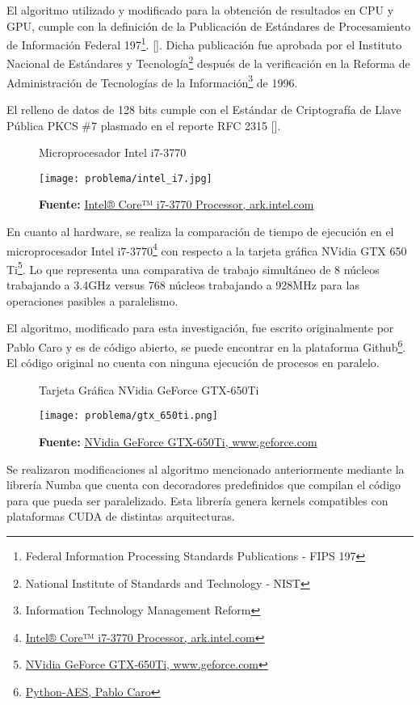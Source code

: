 \documentclass[../main/main.tex]{subfiles}
\begin{document}
  El algoritmo utilizado y modificado para la obtención de resultados en CPU y GPU, cumple con la definición de la Publicación de Estándares de Procesamiento de Información Federal 197\footnote{Federal Information Processing Standards Publications - FIPS 197}. [\cite{report:FIPS_197}]. Dicha publicación fue aprobada por el Instituto Nacional de Estándares y Tecnología\footnote{National Institute of Standards and Technology - NIST} después de la verificación en la Reforma de Administración de Tecnologías de la Información\footnote{Information Technology Management Reform} de 1996.

  El relleno de datos de 128 bits cumple con el Estándar de Criptografía de Llave Pública PKCS \#7 plasmado en el reporte RFC 2315 [\cite{report:RFC_2315}].

  \begin{figure}
    \centering
    \caption{Microprocesador Intel i7-3770}
    \texttt{[image: problema/intel\_i7.jpg]}
    \caption*{\textbf{Fuente:} \href{https://tinyurl.com/yb3tqpvu}{Intel® Core™ i7-3770 Processor, ark.intel.com}}
  \end{figure}

  En cuanto al hardware, se realiza la comparación de tiempo de ejecución en el microprocesador Intel i7-3770\footnote{\href{https://tinyurl.com/yb3tqpvu}{Intel® Core™ i7-3770 Processor, ark.intel.com}} con respecto a la tarjeta gráfica NVidia GTX 650 Ti\footnote{\href{https://tinyurl.com/ycr3kouv}{NVidia GeForce GTX-650Ti, www.geforce.com}}. Lo que representa una comparativa de trabajo simultáneo de 8 núcleos trabajando a 3.4GHz versus 768 núcleos trabajando a 928MHz para las operaciones pasibles a paralelismo.

  El algoritmo, modificado para esta investigación, fue escrito originalmente por Pablo Caro y es de código abierto, se puede encontrar en la plataforma Github\footnote{\href{https://github.com/pcaro90/Python-AES}{Python-AES, Pablo Caro}}. El código original no cuenta con ninguna ejecución de procesos en paralelo.

  \begin{figure}
    \centering
    \caption{Tarjeta Gráfica NVidia GeForce GTX-650Ti}
    \texttt{[image: problema/gtx\_650ti.png]}
    \caption*{\textbf{Fuente:} \href{https://tinyurl.com/ycr3kouv}{NVidia GeForce GTX-650Ti, www.geforce.com}}
  \end{figure}

  Se realizaron modificaciones al algoritmo mencionado anteriormente mediante la librería Numba que cuenta con decoradores predefinidos que compilan el código para que pueda ser paralelizado. Esta librería genera kernels compatibles con plataformas CUDA de distintas arquitecturas.
\end{document}
